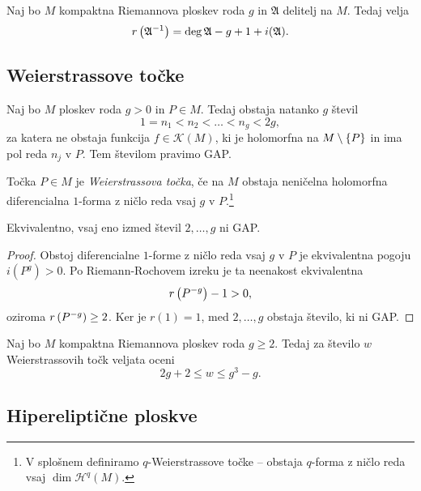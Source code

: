 \begin{izrek}
Naj bo $M$ kompaktna Riemannova ploskev roda $g$ in $\mathfrak{A}$
delitelj na $M$. Tedaj velja
\[
r \left(\mathfrak{A}^{-1}\right) =
\deg \mathfrak{A} - g + 1 + i(\mathfrak{A}).
\]
\end{izrek}


\subsection{Weierstrassove točke}

\begin{izrek}
Naj bo $M$ ploskev roda $g > 0$ in $P \in M$. Tedaj obstaja
natanko $g$ števil
\[
1 = n_1 < n_2 < \dots < n_g < 2g,
\]
za katera ne obstaja funkcija $f \in \mathscr{K}(M)$, ki je
holomorfna na $M \setminus \left\{P\right\}$ in ima pol reda $n_j$ v $P$.
Tem številom pravimo GAP.
\end{izrek}

\begin{definicija}
Točka $P \in M$ je \emph{Weierstrassova točka}, če na $M$ obstaja
neničelna holomorfna diferencialna $1$-forma z ničlo reda vsaj
$g$ v $P$.\footnote{V splošnem definiramo $q$-Weierstrassove točke
-- obstaja $q$-forma z ničlo reda vsaj $\dim \mathscr{H}^q(M)$.}
\end{definicija}

\begin{lema}
Ekvivalentno, vsaj eno izmed števil $2, \dots, g$ ni GAP.
\end{lema}

\begin{proof}
Obstoj diferencialne $1$-forme z ničlo reda vsaj $g$ v $P$ je
ekvivalentna pogoju $i(P^g) > 0$. Po Riemann-Rochovem izreku je ta
neenakost ekvivalentna
\[
r \left(P^{-g}\right) - 1 > 0,
\]
oziroma $r \left(P^{-g}\right) \geq 2$. Ker je $r(1) = 1$, med
$2, \dots, g$ obstaja število, ki ni GAP.
\end{proof}

\begin{lema}
Naj bo $M$ kompaktna Riemannova ploskev roda $g \geq 2$. Tedaj za
število $w$ Weierstrassovih točk veljata oceni
\[
2g + 2 \leq w \leq g^3 - g.
\]
\end{lema}


\subsection{Hipereliptične ploskve}
